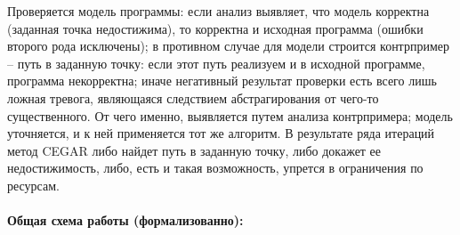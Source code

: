 Проверяется модель программы: если анализ выявляет, что модель корректна (заданная точка недостижима), то корректна и исходная программа (ошибки второго рода исключены); 
в противном случае для модели строится контрпример -- путь в заданную точку: если этот путь реализуем и в исходной программе, программа некорректна; 
иначе негативный результат проверки есть всего лишь ложная тревога, являющаяся следствием абстрагирования от чего-то существенного.
От чего именно, выявляется путем анализа контрпримера; модель уточняется, и к ней применяется тот же алгоритм. 
В результате ряда итераций метод CEGAR либо найдет путь в заданную точку, либо докажет ее недостижимость, либо, есть и такая возможность, упрется в ограничения по ресурсам.

\paragraph{Общая схема работы (формализованно):}

